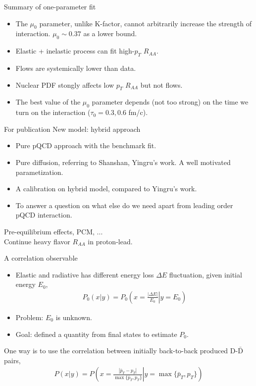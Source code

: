 \documentclass[11pt]{beamer}
\begin{document}
\begin{frame}{Summary of one-parameter fit}
\begin{itemize}
\item The $\mu_0$ parameter, unlike K-factor, cannot arbitrarily increase the strength of interaction. $\mu_0 \sim 0.37$ as a lower bound.
\item Elastic + inelastic process can fit high-$p_T$ $R_{AA}$.
\item Flows are systemically lower than data.
\item Nuclear PDF stongly affects low $p_T$ $R_{AA}$ but not flows.
\item The best value of the $\mu_0$ parameter depends (not too strong) on the time we turn on the interaction ($\tau_0=0.3, 0.6$ fm/c).
\end{itemize}

\end{frame}

\begin{frame}{For publication}
New model: hybrid approach
\begin{itemize}
\item Pure pQCD approach with the benchmark fit.
\item Pure diffusion, referring to Shanshan, Yingru's work. A well motivated parametization.
\item A calibration on hybrid model, compared to Yingru's work.
\item To answer a question on what else do we need apart from leading order pQCD interaction.
\end{itemize}

Pre-equilibrium effects, PCM, ... \\

Continue heavy flavor $R_{AA}$ in proton-lead.\\

\end{frame}

\begin{frame}{A correlation observable}
\begin{itemize}
\item Elastic and radiative has different energy loss $\Delta E$ fluctuation, given initial energy $E_0$, 
\begin{eqnarray}
\nonumber
P_0(x|y) = P_0\left(\left.x = \frac{|\Delta E|}{E_0} \right| y = E_0\right)
\end{eqnarray}
\item Problem: $E_0$ is unknown.
\item Goal: defined a quantity from final states to estimate $P_0$. 
\end{itemize}
One way is to use the correlation between initially back-to-back produced $\mathrm{D}$-$\bar{\mathrm{D}}$ pairs,
\begin{eqnarray}
\nonumber
P(x|y) = P\left(\left.x = \frac{|\bar{p}_T - p_T|}{\max\{\bar{p}_T, p_T\}} \right| y = \max\{\bar{p}_T, p_T\} \right)
\end{eqnarray}
\end{frame}
\end{document}

